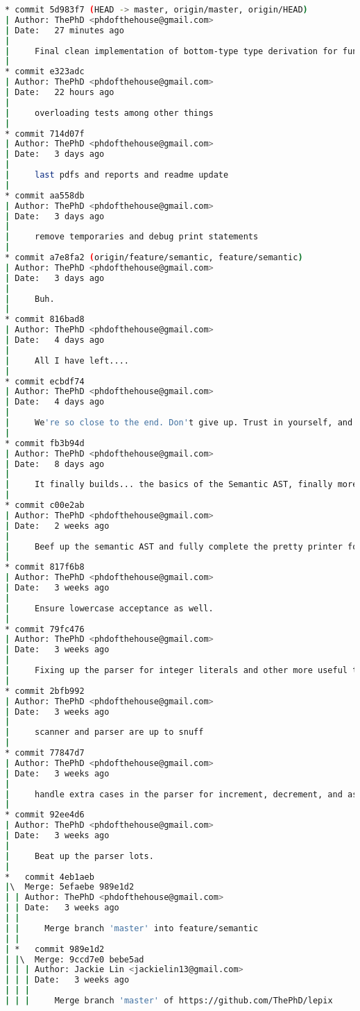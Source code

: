 \begin{lstlisting}[language=bash]
* commit 5d983f7 (HEAD -> master, origin/master, origin/HEAD)
| Author: ThePhD <phdofthehouse@gmail.com>
| Date:   27 minutes ago
| 
|     Final clean implementation of bottom-type type derivation for function returns, good literals, and overloading
|  
* commit e323adc
| Author: ThePhD <phdofthehouse@gmail.com>
| Date:   22 hours ago
| 
|     overloading tests among other things
|  
* commit 714d07f
| Author: ThePhD <phdofthehouse@gmail.com>
| Date:   3 days ago
| 
|     last pdfs and reports and readme update
|  
* commit aa558db
| Author: ThePhD <phdofthehouse@gmail.com>
| Date:   3 days ago
| 
|     remove temporaries and debug print statements
|  
* commit a7e8fa2 (origin/feature/semantic, feature/semantic)
| Author: ThePhD <phdofthehouse@gmail.com>
| Date:   3 days ago
| 
|     Buh.
|  
* commit 816bad8
| Author: ThePhD <phdofthehouse@gmail.com>
| Date:   4 days ago
| 
|     All I have left....
|  
* commit ecbdf74
| Author: ThePhD <phdofthehouse@gmail.com>
| Date:   4 days ago
| 
|     We're so close to the end. Don't give up. Trust in yourself, and fight for what was right...
|  
* commit fb3b94d
| Author: ThePhD <phdofthehouse@gmail.com>
| Date:   8 days ago
| 
|     It finally builds... the basics of the Semantic AST, finally more or less in place...!
|  
* commit c00e2ab
| Author: ThePhD <phdofthehouse@gmail.com>
| Date:   2 weeks ago
| 
|     Beef up the semantic AST and fully complete the pretty printer for it.
|  
* commit 817f6b8
| Author: ThePhD <phdofthehouse@gmail.com>
| Date:   3 weeks ago
| 
|     Ensure lowercase acceptance as well.
|  
* commit 79fc476
| Author: ThePhD <phdofthehouse@gmail.com>
| Date:   3 weeks ago
| 
|     Fixing up the parser for integer literals and other more useful things.
|  
* commit 2bfb992
| Author: ThePhD <phdofthehouse@gmail.com>
| Date:   3 weeks ago
| 
|     scanner and parser are up to snuff
|  
* commit 77847d7
| Author: ThePhD <phdofthehouse@gmail.com>
| Date:   3 weeks ago
| 
|     handle extra cases in the parser for increment, decrement, and assignment-ops
|  
* commit 92ee4d6
| Author: ThePhD <phdofthehouse@gmail.com>
| Date:   3 weeks ago
| 
|     Beat up the parser lots.
|    
*   commit 4eb1aeb
|\  Merge: 5efaebe 989e1d2
| | Author: ThePhD <phdofthehouse@gmail.com>
| | Date:   3 weeks ago
| | 
| |     Merge branch 'master' into feature/semantic
| |     
| *   commit 989e1d2
| |\  Merge: 9ccd7e0 bebe5ad
| | | Author: Jackie Lin <jackielin13@gmail.com>
| | | Date:   3 weeks ago
| | | 
| | |     Merge branch 'master' of https://github.com/ThePhD/lepix

\end{lstlisting}
